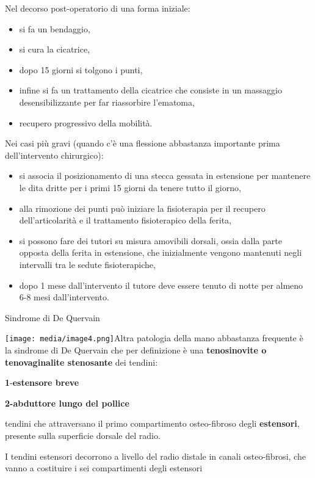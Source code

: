\documentclass[]{article}
\begin{document}
Nel decorso post-operatorio di una forma iniziale:

\begin{itemize}
\item
  si fa un bendaggio,
\item
  si cura la cicatrice,
\item
  dopo 15 giorni si tolgono i punti,
\item
  infine si fa un trattamento della cicatrice che consiste in un
  massaggio desensibilizzante per far riassorbire l'ematoma,
\item
  recupero progressivo della mobilità.
\end{itemize}

Nei casi più gravi (quando c'è una flessione abbastanza importante prima
dell'intervento chirurgico):

\begin{itemize}
\item
  si associa il posizionamento di una stecca gessata in estensione per
  mantenere le dita dritte per i primi 15 giorni da tenere tutto il
  giorno,
\item
  alla rimozione dei punti può iniziare la fisioterapia per il recupero
  dell'articolarità e il trattamento fisioterapico della ferita,
\item
  si possono fare dei tutori su misura amovibili dorsali, ossia dalla
  parte opposta della ferita in estensione, che inizialmente vengono
  mantenuti negli intervalli tra le sedute fisioterapiche,
\item
  dopo 1 mese dall'intervento il tutore deve essere tenuto di notte per
  almeno 6-8 mesi dall'intervento.
\end{itemize}

Sindrome di De Quervain

\texttt{[image: media/image4.png]}Altra
patologia della mano abbastanza frequente è la sindrome di De Quervain
che per definizione è una \textbf{tenosinovite o tenovaginalite
stenosante} dei tendini:

\textbf{1}-\textbf{estensore breve }

\textbf{2-abduttore lungo del pollice}

tendini che attraversano il primo compartimento osteo-fibroso degli
\textbf{estensori}, presente sulla superficie dorsale del radio.

I tendini estensori decorrono a livello del radio distale in canali
osteo-fibrosi, che vanno a costituire i sei compartimenti degli
estensori
\end{document}
